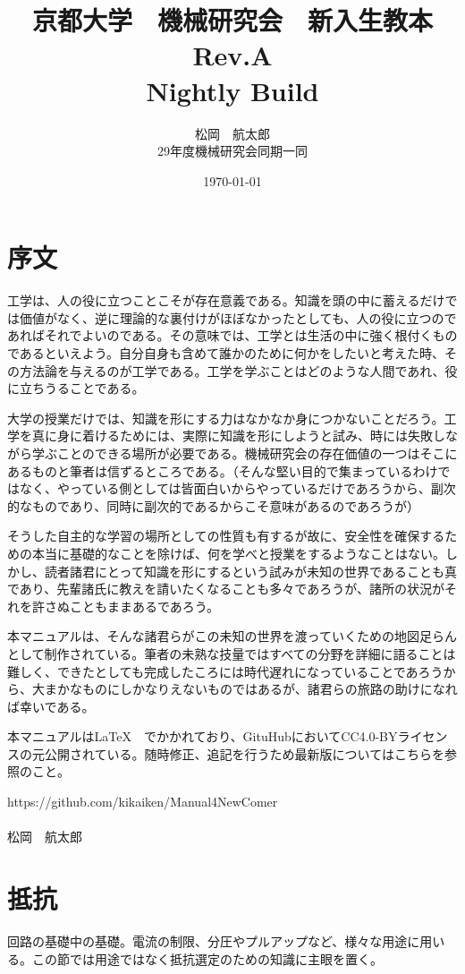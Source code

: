 \documentclass[a4paper,titlepage,here]{ujarticle}
\title{京都大学　機械研究会　新入生教本\\ Rev.A \\Nightly Build}
\date{\today}
\author{松岡　航太郎\\29年度機械研究会同期一同}
\begin{document}
\maketitle
\begin{multicols}{2}
\tableofcontents
\end{multicols}
\newpage
\section{序文}
工学は、人の役に立つことこそが存在意義である。知識を頭の中に蓄えるだけでは価値がなく、逆に理論的な裏付けがほぼなかったとしても、人の役に立つのであればそれでよいのである。その意味では、工学とは生活の中に強く根付くものであるといえよう。自分自身も含めて誰かのために何かをしたいと考えた時、その方法論を与えるのが工学である。工学を学ぶことはどのような人間であれ、役に立ちうることである。

大学の授業だけでは、知識を形にする力はなかなか身につかないことだろう。工学を真に身に着けるためには、実際に知識を形にしようと試み、時には失敗しながら学ぶことのできる場所が必要である。機械研究会の存在価値の一つはそこにあるものと筆者は信ずるところである。（そんな堅い目的で集まっているわけではなく、やっている側としては皆面白いからやっているだけであろうから、副次的なものであり、同時に副次的であるからこそ意味があるのであろうが）

そうした自主的な学習の場所としての性質も有するが故に、安全性を確保するための本当に基礎的なことを除けば、何を学べと授業をするようなことはない。しかし、読者諸君にとって知識を形にするという試みが未知の世界であることも真であり、先輩諸氏に教えを請いたくなることも多々であろうが、諸所の状況がそれを許さぬこともままあるであろう。

本マニュアルは、そんな諸君らがこの未知の世界を渡っていくための地図足らんとして制作されている。筆者の未熟な技量ではすべての分野を詳細に語ることは難しく、できたとしても完成したころには時代遅れになっていることであろうから、大まかなものにしかなりえないものではあるが、諸君らの旅路の助けになれば幸いである。

本マニュアルは\LaTeX　でかかれており、GituHubにおいてCC4.0-BYライセンスの元公開されている。随時修正、追記を行うため最新版についてはこちらを参照のこと。

https://github.com/kikaiken/Manual4NewComer\\\\
松岡　航太郎
\newpage
\section{抵抗}
回路の基礎中の基礎。電流の制限、分圧やプルアップなど、様々な用途に用いる。この節では用途ではなく抵抗選定のための知識に主眼を置く。
\end{document}
